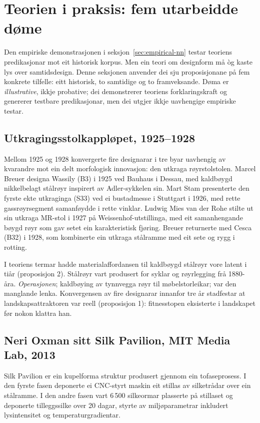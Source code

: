 \section{Teorien i praksis: fem utarbeidde døme}
\label{sec:examples-nn}

Den empiriske demonstrasjonen i seksjon~\ref{sec:empirical-nn} testar teoriens predikasjonar mot eit historisk korpus. Men ein teori om designform må òg kaste lys over samtidsdesign. Denne seksjonen anvender dei sju proposisjonane på fem konkrete tilfelle: eitt historisk, to samtidige og to framveksande. Døma er \textit{illustrative}, ikkje probative; dei demonstrerer teoriens forklaringskraft og genererer testbare predikasjonar, men dei utgjer ikkje uavhengige empiriske testar.

\subsection{Utkragingsstolkappløpet, 1925--1928}

Mellom 1925 og 1928 konvergerte fire designarar i tre byar uavhengig av kvarandre mot ein delt morfologisk innovasjon: den utkraga røyrstolstolen. Marcel Breuer designa Wassily (B3) i 1925 ved Bauhaus i Dessau, med kaldbøygd nikkelbelagt stålrøyr inspirert av Adler-sykkelen sin. Mart Stam presenterte den fyrste ekte utkraginga (S33) ved ei bustadmesse i Stuttgart i 1926, med rette gassrøyrsegment samanføydde i rette vinklar. Ludwig Mies van der Rohe stilte ut sin utkraga MR-stol i 1927 på Weissenhof-utstillinga, med eit samanhengande bøygd røyr som gav setet ein karakteristisk fjøring. Breuer returnerte med Cesca (B32) i 1928, som kombinerte ein utkraga stålramme med eit sete og rygg i rotting.

I teoriens termar hadde materialaffordansen til kaldbøygd stålrøyr vore latent i tiår (proposisjon 2). Stålrøyr vart produsert for syklar og røyrlegging frå 1880-åra. \textit{Operasjonen}; kaldbøying av tynnvegga røyr til møbelstorleikar; var den manglande lenka. Konvergensen av fire designarar innanfor tre år stadfestar at landskapsattraktoren var reell (proposisjon 1): fitnesstopen eksisterte i landskapet før nokon klattra han.

\subsection{Neri Oxman sitt Silk Pavilion, MIT Media Lab, 2013}

Silk Pavilion er ein kupelforma struktur produsert gjennom ein tofaseprosess. I den fyrste fasen deponerte ei CNC-styrt maskin eit stillas av silketrådar over ein stålramme. I den andre fasen vart 6\,500 silkeormar plasserte på stillaset og deponerte tilleggssilke over 20 dagar, styrte av miljøparametrar inkludert lysintensitet og temperaturgradi\-entar.

